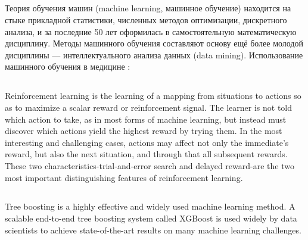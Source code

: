 \subsection{}
Теория обучения машин (machine learning, машинное обучение) находится на стыке прикладной статистики, численных методов оптимизации, дискретного анализа, и за последние 50 лет оформилась в самостоятельную математическую дисциплину. Методы машинного обучения составляют основу ещё более молодой дисциплины — интеллектуального анализа данных (data mining).  \cite{воронцов2009машинное} \cite{marsland2015machine} \cite{conway2012machine}
Использование машинного обучения в медицине : \cite{shipp2002diffuse} \cite{ye2003predicting}

\subsection{}

\cite{лаптев2011применение} \cite{Magnusson:2012:SCW:2351316.2351327} \cite{hung2006applying} \cite{nelson2008exploiting} \cite{arisholm2007data} \cite{nguyen2012timely} 
Reinforcement learning is the learning of a mapping from situations to actions so as to maximize a scalar reward or reinforcement signal. The learner is not told which action to take, as in most forms of machine learning, but instead must discover which actions yield the highest reward by trying them. In the most interesting and challenging cases, actions may affect not only the immediate's reward, but also the next situation, and through that all subsequent rewards. These two characteristics-trial-and-error search and delayed reward-are the two most important distinguishing features of reinforcement learning. \cite{book:963927} \cite{sutton1998introduction}



\subsection{}
Tree boosting is a highly effective and widely used machine learning method. A scalable end-to-end tree boosting system called XGBoost is used widely by data scientists to achieve state-of-the-art results on many machine learning challenges. \cite{DBLP:journals/corr/ChenG16} 

